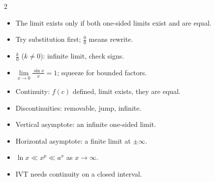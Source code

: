 \documentclass[11pt]{article}
\begin{document}
\begin{multicols}{2}\small
\begin{itemize}
\item The limit exists only if both one-sided limits exist and are equal.
\item Try substitution first; $\frac00$ means rewrite.
\item $\frac{k}{0}$ ($k\neq0$): infinite limit, check signs.
\item $\lim\limits_{x\to0}\frac{\sin x}{x}=1$; squeeze for bounded factors.
\item Continuity: $f(c)$ defined, limit exists, they are equal.
\item Discontinuities: removable, jump, infinite.
\item Vertical asymptote: an infinite one-sided limit.
\item Horizontal asymptote: a finite limit at $\pm\infty$.
\item $\ln x\ll x^p\ll a^x$ as $x\to\infty$.
\item IVT needs continuity on a closed interval.
\end{itemize}
\end{multicols}
\end{document}
